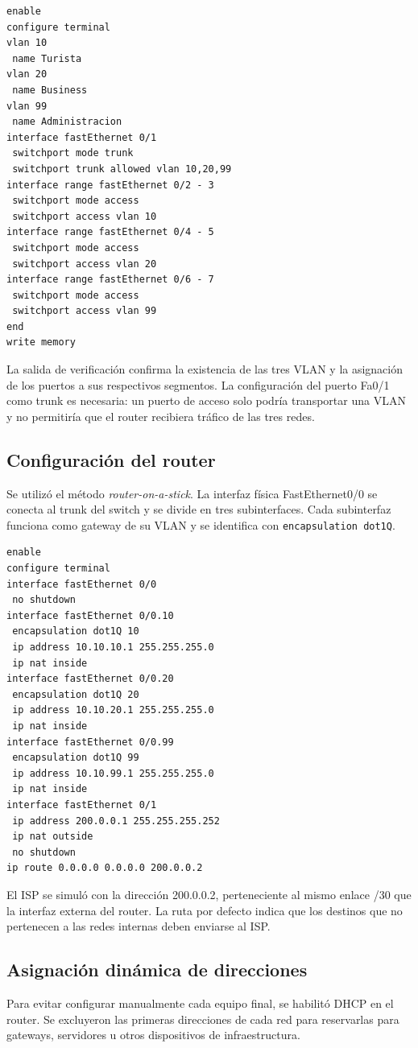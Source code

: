 \documentclass[12pt,a4paper]{article}
\begin{document}
\begin{verbatim}
enable
configure terminal
vlan 10
 name Turista
vlan 20
 name Business
vlan 99
 name Administracion
interface fastEthernet 0/1
 switchport mode trunk
 switchport trunk allowed vlan 10,20,99
interface range fastEthernet 0/2 - 3
 switchport mode access
 switchport access vlan 10
interface range fastEthernet 0/4 - 5
 switchport mode access
 switchport access vlan 20
interface range fastEthernet 0/6 - 7
 switchport mode access
 switchport access vlan 99
end
write memory
\end{verbatim}

La salida de verificación confirma la existencia de las tres VLAN y la asignación de los puertos a sus respectivos segmentos. La configuración del puerto Fa0/1 como trunk es necesaria: un puerto de acceso solo podría transportar una VLAN y no permitiría que el router recibiera tráfico de las tres redes.

\subsection{Configuración del router}
Se utilizó el método \textit{router-on-a-stick}. La interfaz física FastEthernet0/0 se conecta al trunk del switch y se divide en tres subinterfaces. Cada subinterfaz funciona como gateway de su VLAN y se identifica con \texttt{encapsulation dot1Q}.

\begin{verbatim}
enable
configure terminal
interface fastEthernet 0/0
 no shutdown
interface fastEthernet 0/0.10
 encapsulation dot1Q 10
 ip address 10.10.10.1 255.255.255.0
 ip nat inside
interface fastEthernet 0/0.20
 encapsulation dot1Q 20
 ip address 10.10.20.1 255.255.255.0
 ip nat inside
interface fastEthernet 0/0.99
 encapsulation dot1Q 99
 ip address 10.10.99.1 255.255.255.0
 ip nat inside
interface fastEthernet 0/1
 ip address 200.0.0.1 255.255.255.252
 ip nat outside
 no shutdown
ip route 0.0.0.0 0.0.0.0 200.0.0.2
\end{verbatim}

El ISP se simuló con la dirección 200.0.0.2, perteneciente al mismo enlace /30 que la interfaz externa del router. La ruta por defecto indica que los destinos que no pertenecen a las redes internas deben enviarse al ISP.

\subsection{Asignación dinámica de direcciones}
Para evitar configurar manualmente cada equipo final, se habilitó DHCP en el router. Se excluyeron las primeras direcciones de cada red para reservarlas para gateways, servidores u otros dispositivos de infraestructura.
\end{document}
